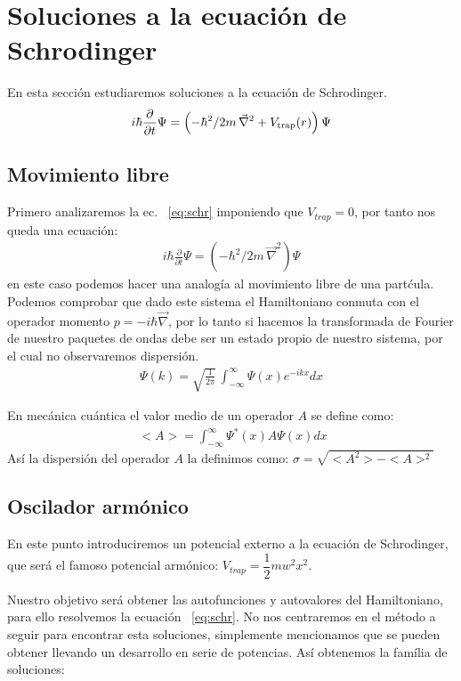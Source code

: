 \section{Soluciones a la ecuaci\'on de Schrodinger}
En esta secci\'on estudiaremos soluciones a la ecuación de Schrodinger.
\begin{align}
i\hbar\frac{\partial}{\partial t}
\Psi =\left(-\hbar^2/2m \,\vec{\nabla}^2+V_{\rm trap}(r) 
\right)\Psi
\label{eq:schr}
\end{align}
\subsection{Movimiento libre}
Primero analizaremos la ec. ~\eqref{eq:schr} imponiendo que $V_{trap}=0$, por tanto nos queda una ecuaci\'on:
\begin{align}
i\hbar\frac{\partial}{\partial t}
\Psi =\left(-\hbar^2/2m \,\vec{\nabla}^2 
\right)\Psi
\label{eq:schr_free}
\end{align}
 en este caso podemos hacer una analog\'ia al movimiento libre de una part\'cula. Podemos comprobar que dado este sistema el Hamiltoniano conmuta con el operador momento $p=-i\hbar\vec{\nabla}$, por lo tanto si hacemos la transformada de Fourier de nuestro paquetes de ondas debe ser un estado propio de nuestro sistema, por el cual no observaremos dispersi\'on.
 \begin{align}
 \Psi(k) =\sqrt{\frac{1}{2\pi}} \,\int_{-\infty}^{\infty}\Psi(x)e^{-ikx}dx
 \label{eq:four}
 \end{align}
 
 En mec\'anica cu\'antica el valor medio de un operador $A$ se define como:
 \begin{align}
 \ <A>=\int_{-\infty}^{\infty}\Psi^{*}(x)A\Psi(x) dx
 \label{eq:mean}
 \end{align}
 As\'i la dispersi\'on del operador $A$ la definimos como: $ \sigma=\sqrt{<A^2>-<A>^2}  $
 \\
 
\subsection{Oscilador arm\'onico}
En este punto introduciremos un potencial externo a la ecuaci\'on de Schrodinger, que ser\'a el famoso potencial arm\'onico:  $V_{trap}=\dfrac{1}{2}mw^2x^2$.

Nuestro objetivo ser\'a obtener las autofunciones y autovalores del Hamiltoniano, para ello resolvemos la ecuaci\'on ~\eqref{eq:schr}. No nos centraremos en el m\'etodo a seguir para encontrar esta soluciones, simplemente mencionamos que se pueden obtener llevando un desarrollo en serie de potencias. As\'i obtenemos la fam\'ilia de soluciones:

